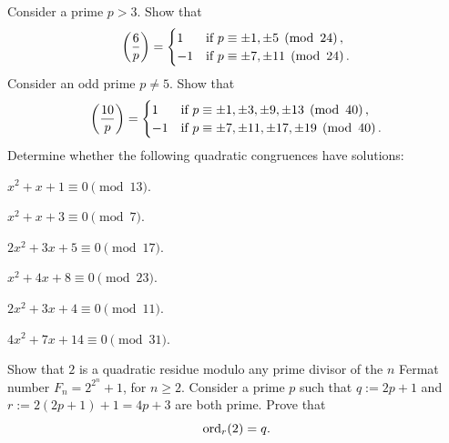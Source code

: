 \begin{routine}
  \exercise Consider a prime $p>3$. Show that
  \begin{equation*}
    \legendre{6}{p}=
    \begin{cases}
      1 & \text{if }p\equiv \pm 1,\pm 5\pmod{24}, \\
      -1 & \text{if }p\equiv \pm 7,\pm 11\pmod{24}.
    \end{cases}
  \end{equation*}
  \exercise Consider an odd prime $p\neq 5$. Show that
  \begin{equation*}
    \legendre{10}{p}=
    \begin{cases}
      1 & \text{if }p\equiv \pm 1,\pm3, \pm 9,\pm 13 \pmod{40}, \\
      -1 & \text{if }p\equiv \pm 7, \pm 11, \pm 17, \pm 19 \pmod{40}.
    \end{cases}
  \end{equation*}
  \exercise Determine whether the following quadratic congruences have solutions:
  \begin{subexenum}
  \item $x^2+x+1\equiv 0\pmod{13}$.
  \item $x^2+x+3\equiv 0\pmod{7}$.
  \item $2x^2+3x+5\equiv 0\pmod{17}$.
  \item $x^2+4x+8\equiv 0\pmod{23}$.
  \item $2x^2+3x+4\equiv 0\pmod{11}$.
  \item $4x^2 + 7x+14 \equiv 0\pmod{31}$.
  \end{subexenum}  
  \exercise Show that $2$ is a quadratic residue modulo any prime divisor of the $n$\supth{} Fermat number $F_n=2^{2^n}+1$, for $n\geq 2$.
  \exercise Consider a prime $p$ such that $q:=2p+1$ and $r:=2(2p+1)+1=4p+3$ are both prime. Prove that
  \begin{equation*}
    \operatorname{ord}_r(2)=q.
  \end{equation*}
\end{routine}

